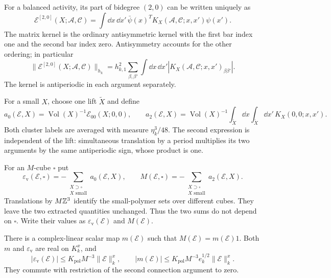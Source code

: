 For a balanced activity, its part of bidegree $(2,0)$ can be
written uniquely as
\[
 \mathscr E^{[2,0]}(X;\mathscr A,\mathscr C)
   =\int\dd x\,\dd x'\,
             \bar\psi(x)^T K_X(\mathscr A,\mathscr C;x,x')\psi(x').
\]
The matrix kernel is the ordinary antisymmetric kernel with
the first bar index one and the second bar index zero.
Antisymmetry accounts for the other ordering; in particular
\begin{equation}\label{eq:rg-bilinear-norm}
 \|\mathscr E^{[2,0]}(X;\mathscr A,\mathscr C)\|_{h_k}
   =h_{k,1}^2\sum_{\beta,\beta'}\int\dd x\,\dd x'
                     |K_X(\mathscr A,\mathscr C;x,x')_{\beta\beta'}|.
\end{equation}
The kernel is antiperiodic in each argument separately.

For a small $X$, choose one lift $\widetilde X$ and define
\begin{equation}\label{eq:rg-local-extractions}
 a_0(\mathscr E,X)
       =\operatorname{Vol}(X)^{-1}\mathscr E_{00}(X;0,0),\qquad
 a_2(\mathscr E,X)
       =\operatorname{Vol}(X)^{-1}
             \int_{\widetilde X}\dd x\int_{\widetilde X}\dd x'\,
                                                    K_X(0,0;x,x').
\end{equation}
Both cluster labels are averaged with measure $\eta_k^3/48$.
The second expression is independent of the lift: simultaneous
translation by a period multiplies its two arguments by the
same antiperiodic sign, whose product is one.

For an $M$-cube $\square$ put
\begin{equation}\label{eq:rg-counterterm-maps}
 \varepsilon_{\mathrm v}(\mathscr E,\square)
          =-\sum_{\substack{X\supset\square\\X\text{ small}}}
                                                     a_0(\mathscr E,X),
 \qquad
 M(\mathscr E,\square)
          =-\sum_{\substack{X\supset\square\\X\text{ small}}}
                                                     a_2(\mathscr E,X).
\end{equation}
Translations by $M\mathbb Z^3$ identify the small-polymer sets over
different cubes. They leave the two extracted quantities
unchanged. Thus the two sums do not depend on $\square$.
Write their values as $\varepsilon_{\mathrm v}(\mathscr E)$ and
$M(\mathscr E)$.

\begin{proposition}\label{prop:rg-scalar-counterterms}
There is a complex-linear scalar map $m(\mathscr E)$ such that
$M(\mathscr E)=m(\mathscr E)1$. Both $m$ and
$\varepsilon_{\mathrm v}$ are real on $K_k^x$, and
\begin{equation}\label{eq:rg-counterterm-bounds}
 |\varepsilon_{\mathrm v}(\mathscr E)|
                  \le K_{\mathrm{pol}}M^{-3}\|\mathscr E\|_k^x,
 \qquad
 |m(\mathscr E)|\le K_{\mathrm{pol}}M^{-3}e_k^{1/2}\|\mathscr E\|_k^x.
\end{equation}
They commute with restriction of the second connection argument
to zero.
\end{proposition}

